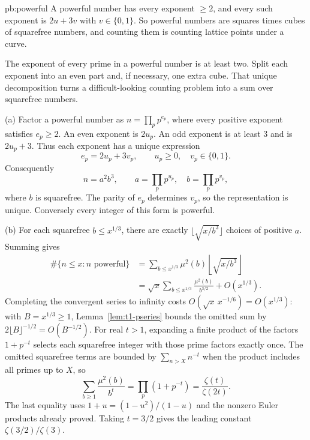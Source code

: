 \begin{solution}{pb:powerful}
\idea A powerful number has every exponent $\ge2$, and every such exponent is $2u+3v$ with $v\in\{0,1\}$. So powerful numbers are
squares times cubes of squarefree numbers, and counting them is counting lattice points under a curve.

\writeup
The exponent of every prime in a powerful number is at least two. Split each exponent into an even part and, if necessary, one extra cube. That unique decomposition turns a difficult-looking counting problem into a sum over squarefree numbers.

 (a) Factor a powerful number as $n=\prod_p p^{e_p}$, where every positive exponent satisfies $e_p\ge2$. An even exponent is $2u_p$. An odd exponent is at least $3$ and is $2u_p+3$. Thus each exponent has a unique expression
\[
e_p=2u_p+3v_p,\qquad u_p\ge0,\quad v_p\in\{0,1\}.
\]
Consequently
\[
n=a^2b^3,\qquad
a=\prod_pp^{u_p},\quad b=\prod_pp^{v_p},
\]
where $b$ is squarefree. The parity of $e_p$ determines $v_p$, so the representation is unique. Conversely every integer of this form is powerful.

(b) For each squarefree $b\le x^{1/3}$, there are exactly $\lfloor\sqrt{x/b^3}\rfloor$ choices of positive $a$. Summing gives
\[
\begin{aligned}
\#\{n\le x:n\text{ powerful}\}
&=\sum_{b\le x^{1/3}}\mu^2(b)
  \left\lfloor\sqrt{x/b^3}\right\rfloor\\
&=\sqrt{x}\sum_{b\le x^{1/3}}\frac{\mu^2(b)}{b^{3/2}}
  +O(x^{1/3}).
\end{aligned}
\]
Completing the convergent series to infinity costs
$O(\sqrt{x}\,x^{-1/6})=O(x^{1/3})$: with $B=x^{1/3}\ge1$,
Lemma~\ref{lem:t1-pseries} bounds the omitted sum by
$2\lfloor B\rfloor^{-1/2}=O(B^{-1/2})$. For real $t>1$, expanding a finite product of the factors $1+p^{-t}$ selects each squarefree integer with those prime factors exactly once. The omitted squarefree terms are bounded by $\sum_{n>X}n^{-t}$ when the product includes all primes up to $X$, so
\[
\sum_{b\ge1}\frac{\mu^2(b)}{b^t}
=\prod_p(1+p^{-t})
=\frac{\zeta(t)}{\zeta(2t)}.
\]
The last equality uses $1+u=(1-u^2)/(1-u)$ and the nonzero Euler products already proved. Taking $t=3/2$ gives the leading constant $\zeta(3/2)/\zeta(3)$.


\end{solution}
